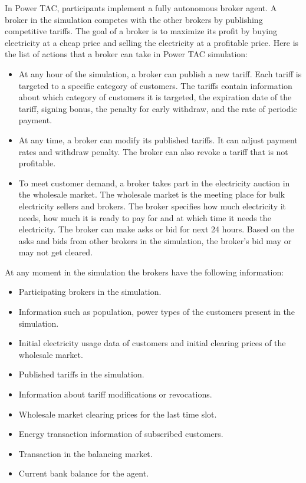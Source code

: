 In Power TAC, participants implement a fully autonomous broker agent. A broker in the simulation competes with the other brokers by publishing competitive tariffs. The goal of a broker is to maximize its profit by buying electricity at a cheap price and selling the electricity at a profitable price. Here is the list of actions that a broker can take in Power TAC simulation:
\begin{itemize}  
\item At any hour of the simulation, a broker can publish a new tariff. Each tariff is targeted to a specific category of customers. The tariffs contain information about which category of customers it is targeted, the expiration date of the tariff, signing bonus, the penalty for early withdraw, and the rate of periodic payment. 
\item At any time, a broker can modify its published tariffs. It can adjust payment rates and withdraw penalty. The broker can also revoke a tariff that is not profitable.
\item To meet customer demand, a broker takes part in the electricity auction in the wholesale market. The wholesale market is the meeting place for bulk electricity sellers and brokers. The broker specifies how much electricity it needs, how much it is ready to pay for and at which time it needs the electricity. The broker can make asks or bid for next 24 hours. Based on the asks and bids from other brokers in the simulation, the broker's bid may or may not get cleared. 
\end{itemize}

At any moment in the simulation the brokers have the following information: 
\begin{itemize}  
\item Participating brokers in the simulation. 
\item Information such as population, power types of the customers present in the simulation.
\item Initial electricity usage data of customers and initial clearing prices of the wholesale market.
\item Published tariffs in the simulation.
\item Information about tariff modifications or revocations.
\item Wholesale market clearing prices for the last time slot.
\item Energy transaction information of subscribed customers.
\item Transaction in the balancing market.
\item Current bank balance for the agent.
\end{itemize}


